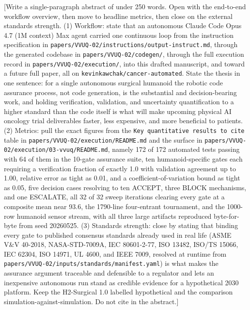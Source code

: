 
[Write a single-paragraph abstract of under 250 words. Open with the end-to-end
workflow overview, then move to headline metrics, then close on the external
standards strength. (1) Workflow: state that an autonomous Claude Code Opus 4.7
(1M context) Max agent carried one continuous loop from the instruction
specification in \texttt{papers/VVUQ-02/instructions/output-instruct.md}, through
the generated codebase in \texttt{papers/VVUQ-02/codegen/}, through the full
execution record in \texttt{papers/VVUQ-02/execution/}, into this drafted
manuscript, and toward a future full paper, all on \texttt{kevinkawchak/cancer-automated}.
State the thesis in one sentence: for a single autonomous surgical humanoid the
robotic code assurance process, not code generation, is the substantial and
decision-bearing work, and holding verification, validation, and uncertainty
quantification to a higher standard than the code itself is what will make
upcoming physical AI oncology trial deliverables faster, less expensive, and more
beneficial to patients. (2) Metrics: pull the exact figures from the
\texttt{Key quantitative results to cite} table in \texttt{papers/VVUQ-02/execution/README.md}
and the surface in \texttt{papers/VVUQ-02/execution/03-vvuq/README.md}, namely
172 of 172 automated tests passing with 64 of them in the 10-gate assurance suite,
ten humanoid-specific gates each requiring a verification fraction of exactly 1.0
with validation agreement up to 1.00, relative error as tight as 0.01, and a
coefficient-of-variation bound as tight as 0.05, five decision cases resolving to
ten ACCEPT, three BLOCK mechanisms, and one ESCALATE, all 32 of 32 sweep
iterations clearing every gate at a composite mean near 93.6, the 1790-line
four-entrant tournament, and the 1000-row humanoid sensor stream, with all three
large artifacts reproduced byte-for-byte from seed 20260525. (3) Standards
strength: close by stating that binding every gate to published consensus
standards already used in real life (ASME V\&V 40-2018, NASA-STD-7009A,
IEC 80601-2-77, ISO 13482, ISO/TS 15066, IEC 62304, ISO 14971, UL 4600, and IEEE
7009, resolved at runtime from \texttt{papers/VVUQ-02/inputs/standards/manifest.yaml})
is what makes the assurance argument traceable and defensible to a regulator and
lets an inexpensive autonomous run stand as credible evidence for a hypothetical
2030 platform. Keep the H2-Surgical 1.0 labelled hypothetical and the comparison
simulation-against-simulation. Do not cite in the abstract.]
